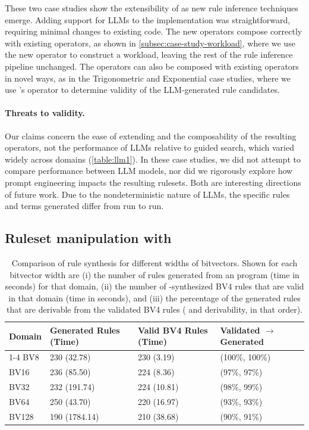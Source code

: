  These two case studies show the extensibility of
 \enumo as new rule inference techniques emerge.
Adding support for LLMs to the \enumo implementation was straightforward,
  requiring minimal changes to existing code.
The new operators compose correctly with existing \enumo operators,
  as shown in \autoref{subsec:case-study-workload}, where we use the
  new  operator to construct a workload, leaving
  the rest of the rule inference pipeline unchanged.
The operators can also be composed with existing operators in novel ways,
  as in the Trigonometric and Exponential case studies, where we
  use \enumo's  operator to determine validity of the LLM-generated
  rule candidates.

\paragraph*{Threats to validity.}
Our claims concern the ease of extending \enumo and the composability of
  the resulting operators, not the performance of LLMs relative to guided
  search, which varied widely across domains (\autoref{table:llm1}).
In these case studies, we did not attempt to
  compare performance between LLM models,
  nor did we rigorously explore how prompt
  engineering impacts the resulting rulesets.
Both are interesting directions of future work.
Due to the nondeterministic nature of LLMs,
  the specific rules and terms generated differ from run to run.

\subsection{Ruleset manipulation with \enumo}
\label{sec:case-study-bv}

\begin{table}[h]
\footnotesize
\begin{tabular}{llll}
Domain  & Generated Rules (Time)      & Valid BV4 Rules (Time)     & Validated $\rightarrow$ Generated \\ \cline{1-4}
BV8     & 230 (32.78)                 &  230 (3.19)                & (100\%, 100\%) \\
BV16    & 236 (85.50)                 &  224 (8.36)                & (97\%, 97\%) \\
BV32    & 232 (191.74)                &  224 (10.81)               & (98\%, 99\%) \\
BV64    & 250 (43.70)                 &  220 (16.97)               & (93\%, 93\%) \\
BV128   & 190 (1784.14)               &  210 (38.68)               & (90\%, 91\%) \\
\end{tabular}%
\caption{
  Comparison of rule synthesis for different widths of bitvectors.
  Shown for each bitvector width are
    (i) the number of rules generated from an
    \enumo program (time in seconds) for that domain,
    (ii) the number of \enumo-synthesized BV4 rules
    that are valid in that domain (time in seconds), and
    (iii) the percentage of the generated rules
    that are derivable from the validated BV4 rules
    ( \lhs and \lhsandrhs derivability, in that order).
}%
\label{table:bv}
\end{table}

